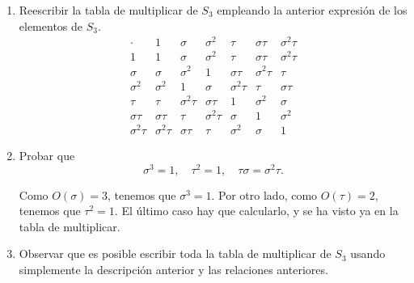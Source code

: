 \begin{ejercicio}
\begin{enumerate}
        \item Reescribir la tabla de multiplicar de $S_3$ empleando la anterior expresión de los elementos de $S_3$.
        \begin{equation*}
            \begin{array}{c|cccccc}
                \cdot & 1 & \sigma & \sigma^2 & \tau & \sigma\tau & \sigma^2\tau \\ \hline
                1 & 1 & \sigma & \sigma^2 & \tau & \sigma\tau & \sigma^2\tau \\
                \sigma & \sigma & \sigma^2 & 1 & \sigma\tau & \sigma^2\tau & \tau \\
                \sigma^2 & \sigma^2 & 1 & \sigma & \sigma^2\tau & \tau & \sigma\tau \\
                \tau & \tau & \sigma^2\tau & \sigma\tau & 1 & \sigma^2 & \sigma \\
                \sigma\tau & \sigma\tau & \tau & \sigma^2\tau & \sigma & 1 & \sigma^2 \\
                \sigma^2\tau & \sigma^2\tau & \sigma\tau & \tau & \sigma^2 & \sigma & 1
            \end{array}
        \end{equation*}
        \item Probar que
        $$\sigma^3 = 1, \quad \tau^2 = 1, \quad \tau\sigma = \sigma^2\tau.$$

        Como $O(\sigma)=3$, tenemos que $\sigma^3=1$. Por otro lado, como $O(\tau)=2$, tenemos que $\tau^2=1$.
        El último caso hay que calcularlo, y se ha visto ya en la tabla de multiplicar.
        \item Observar que es posible escribir toda la tabla de multiplicar de $S_3$ usando simplemente la descripción anterior y las relaciones anteriores.
    \end{enumerate}
\end{ejercicio}

